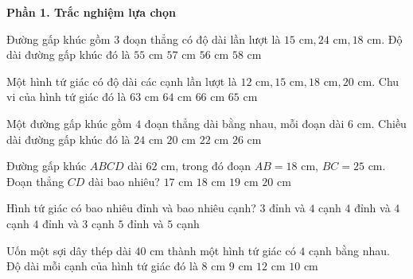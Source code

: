 \textbf{Phần 1. Trắc nghiệm lựa chọn}

\begin{ex} %
Đường gấp khúc gồm $3$ đoạn thẳng có độ dài lần lượt là $15\text{ cm}, 24\text{ cm}, 18\text{ cm}$. Độ dài đường gấp khúc đó là
\choice
{$55\text{ cm}$}
{\True $57\text{ cm}$}
{$56\text{ cm}$}
{$58\text{ cm}$}
\end{ex}

\begin{ex} %
Một hình tứ giác có độ dài các cạnh lần lượt là $12\text{ cm}, 15\text{ cm}, 18\text{ cm}, 20\text{ cm}$. Chu vi của hình tứ giác đó là
\choice
{$63\text{ cm}$}
{$64\text{ cm}$}
{$66\text{ cm}$}
{\True $65\text{ cm}$}
\end{ex}

\begin{ex} %
Một đường gấp khúc gồm $4$ đoạn thẳng dài bằng nhau, mỗi đoạn dài $6\text{ cm}$. Chiều dài đường gấp khúc đó là
\choice
{\True $24\text{ cm}$}
{$20\text{ cm}$}
{$22\text{ cm}$}
{$26\text{ cm}$}
\end{ex}

\begin{ex} %
Đường gấp khúc $ABCD$ dài $62\text{ cm}$, trong đó đoạn $AB = 18\text{ cm}$, $BC = 25\text{ cm}$. Đoạn thẳng $CD$ dài bao nhiêu?
\choice
{$17\text{ cm}$}
{$18\text{ cm}$}
{\True $19\text{ cm}$}
{$20\text{ cm}$}
\end{ex}

\begin{ex} %
Hình tứ giác có bao nhiêu đỉnh và bao nhiêu cạnh?
\choice
{$3$ đỉnh và $4$ cạnh}
{\True $4$ đỉnh và $4$ cạnh}
{$4$ đỉnh và $3$ cạnh}
{$5$ đỉnh và $5$ cạnh}
\end{ex}

\begin{ex} %
Uốn một sợi dây thép dài $40\text{ cm}$ thành một hình tứ giác có $4$ cạnh bằng nhau. Độ dài mỗi cạnh của hình tứ giác đó là
\choice
{$8\text{ cm}$}
{$9\text{ cm}$}
{$12\text{ cm}$}
{\True $10\text{ cm}$}
\end{ex}

